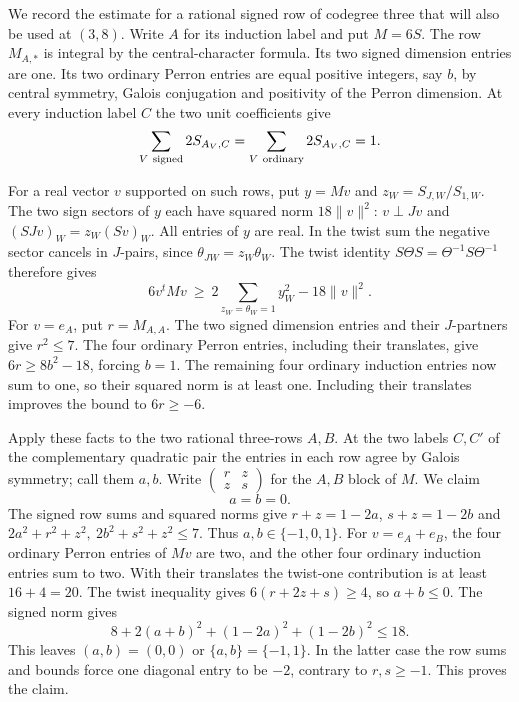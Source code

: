 \documentclass[11pt,reqno]{amsart}
\theoremstyle{remark}\newtheorem{remark}[theorem]{Remark}
\numberwithin{equation}{section}
\begin{document}
We record the estimate for a rational signed row of codegree three
that will also be used at $(3,8)$. Write $A$ for its induction label
and put $M=6S$. The row $M_{A,*}$ is integral by the central-character
formula. Its two signed dimension entries are one. Its two ordinary
Perron entries are equal positive integers, say $b$, by central
symmetry, Galois conjugation and positivity of the Perron dimension.
At every induction label $C$ the two unit coefficients give
\begin{equation}\label{eq:sector-row-sum-33}
 \sum_{V\ {\rm signed}}2S_{A_V,C}
 =\sum_{V\ {\rm ordinary}}2S_{A_V,C}=1 .
\end{equation}

For a real vector $v$ supported on such rows, put $y=Mv$ and
$z_W=S_{J,W}/S_{1,W}$. The two sign sectors of $y$ each have
squared norm $18\|v\|^2$: $v\perp Jv$ and $(SJv)_W=z_W(Sv)_W$.
All entries of $y$ are real. In the twist sum the negative sector
cancels in $J$-pairs, since $\theta_{JW}=z_W\theta_W$. The
twist identity $S\Theta S=\Theta^{-1}S\Theta^{-1}$ therefore gives
\[
 6v^tMv\ \ge\ 2\!\sum_{z_W=\theta_W=1}y_W^2-18\|v\|^2.
\]
For $v=e_A$, put $r=M_{A,A}$. The two signed dimension entries
and their $J$-partners give $r^2\le7$. The four ordinary Perron
entries, including their translates, give $6r\ge8b^2-18$, forcing
$b=1$. The remaining four ordinary induction entries now sum to one,
so their squared norm is at least one. Including their translates
improves the bound to $6r\ge-6$.

Apply these facts to the two rational three-rows $A,B$. At the
two labels $C,C'$ of the complementary quadratic pair the entries
in each row agree by Galois symmetry; call them $a,b$. Write
$\left(\begin{smallmatrix}r&z\\z&s\end{smallmatrix}\right)$ for the
$A,B$ block of $M$. We claim
\begin{equation}\label{eq:two-threes-vanishing}
               a=b=0 .
\end{equation}
The signed row sums and squared norms give $r+z=1-2a$,
$s+z=1-2b$ and
$2a^2+r^2+z^2,\ 2b^2+s^2+z^2\le7$. Thus $a,b\in\{-1,0,1\}$.
For $v=e_A+e_B$, the four ordinary Perron entries of $Mv$ are two,
and the other four ordinary induction entries sum to two. With their
translates the twist-one contribution is at least $16+4=20$.
The twist inequality gives $6(r+2z+s)\ge4$, so $a+b\le0$.
The signed norm gives
\[
 8+2(a+b)^2+(1-2a)^2+(1-2b)^2\le18 .
\]
This leaves $(a,b)=(0,0)$ or $\{a,b\}=\{-1,1\}$. In the latter
case the row sums and bounds force one diagonal entry to be $-2$,
contrary to $r,s\ge-1$. This proves the claim.
\end{document}
